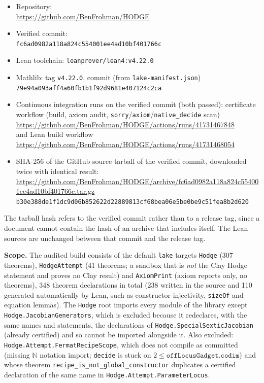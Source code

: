 \documentclass[11pt,a4paper]{article}
\begin{document}
{\raggedright
\begin{itemize}
\item Repository:\\ {\footnotesize\url{https://github.com/BenFrohman/HODGE}}
\item Verified commit:\\ {\footnotesize\texttt{fc6ad0982a118a824c554001ee4ad10bf401766c}}
\item Lean toolchain: \texttt{leanprover/lean4:v4.22.0}
\item Mathlib: tag \texttt{v4.22.0}, commit (from \texttt{lake-manifest.json})\\ {\footnotesize\texttt{79e94a093aff4a60fb1b1f92d9681e407124c2ca}}
\item Continuous integration runs on the verified commit (both passed): certificate workflow (build, axiom audit, \texttt{sorry}/\texttt{axiom}/\texttt{native\_decide} scan)\\ {\footnotesize\url{https://github.com/BenFrohman/HODGE/actions/runs/41731467848}}\\ and Lean build workflow\\ {\footnotesize\url{https://github.com/BenFrohman/HODGE/actions/runs/41731468054}}
\item SHA-256 of the GitHub source tarball of the verified commit, downloaded twice with identical result:\\ {\footnotesize\url{https://github.com/BenFrohman/HODGE/archive/fc6ad0982a118a824c554001ee4ad10bf401766c.tar.gz}}\\
{\footnotesize\texttt{b30e388de1f1dc9d06b852622d22889813cf68bea06e5be0be9c51fea8b2d620}}
\end{itemize}\par}

The tarball hash refers to the verified commit rather than to a release tag, since a document cannot contain the hash of an archive that includes itself. The Lean sources are unchanged between that commit and the release tag.

\textbf{Scope.} The audited build consists of the default \texttt{lake} targets \texttt{Hodge} (307 theorems), \texttt{HodgeAttempt} (41 theorems; a sandbox that is \emph{not} the Clay Hodge statement and proves no Clay result) and \texttt{AxiomPrint} (axiom reports only, no theorems), 348 theorem declarations in total (238 written in the source and 110 generated automatically by Lean, such as constructor injectivity, \texttt{sizeOf} and equation lemmas). The \texttt{Hodge} root imports every module of the library except \texttt{Hodge.JacobianGenerators}, which is excluded because it redeclares, with the same names and statements, the declarations of \texttt{Hodge.SpecialSexticJacobian} (already certified) and so cannot be imported alongside it. Also excluded: \texttt{Hodge.Attempt.FermatRecipeScope}, which does not compile as committed (missing \(\mathbb{N}\) notation import; \texttt{decide} is stuck on \(2\le\texttt{offLocusGadget.codim}\)) and whose theorem \texttt{recipe\_is\_not\_global\_constructor} duplicates a certified declaration of the same name in \texttt{Hodge.Attempt.ParameterLocus}.
\end{document}
